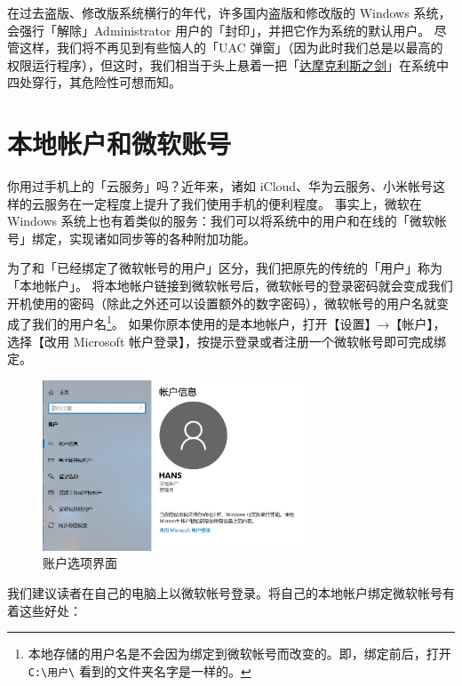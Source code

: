 \begin{note}
  在过去盗版、修改版系统横行的年代，许多国内盗版和修改版的 Windows 系统，会强行「解除」Administrator 用户的「封印」，并把它作为系统的默认用户。
  尽管这样，我们将不再见到有些恼人的「UAC 弹窗」（因为此时我们总是以最高的权限运行程序），但这时，我们相当于头上悬着一把「\href{https://baike.baidu.com/item/%E8%BE%BE%E6%91%A9%E5%85%8B%E5%88%A9%E6%96%AF%E4%B9%8B%E5%89%91/231450}{达摩克利斯之剑}」在系统中四处穿行，其危险性可想而知。
\end{note}

\section{本地帐户和微软账号}

你用过手机上的「云服务」吗？近年来，诸如 iCloud、华为云服务、小米帐号这样的云服务在一定程度上提升了我们使用手机的便利程度。
事实上，微软在 Windows 系统上也有着类似的服务：我们可以将系统中的用户和在线的「微软帐号」绑定，实现诸如同步等的各种附加功能。

为了和「已经绑定了微软帐号的用户」区分，我们把原先的传统的「用户」称为「本地帐户」。
将本地帐户链接到微软帐号后，微软帐号的登录密码就会变成我们开机使用的密码（除此之外还可以设置额外的数字密码），微软帐号的用户名就变成了我们的用户名\footnote{本地存储的用户名是不会因为绑定到微软帐号而改变的。即，绑定前后，打开 \texttt{C:\textbackslash{}用户\textbackslash} 看到的文件夹名字是一样的。}。
如果你原本使用的是本地帐户，打开【设置】→【帐户】，选择【改用 Microsoft 帐户登录】，按提示登录或者注册一个微软帐号即可完成绑定。

\begin{figure}[htb!]
  \centering
  \includegraphics[width=8cm]{assets/Account_Info.jpg}
  \caption{账户选项界面}
  \label{account-info}
\end{figure}

我们建议读者在自己的电脑上以微软帐号登录。将自己的本地帐户绑定微软帐号有着这些好处：

